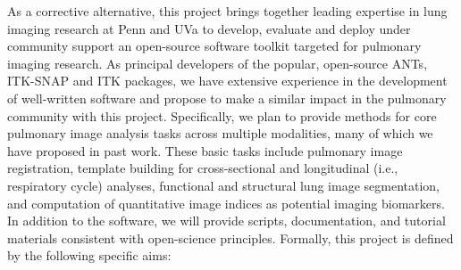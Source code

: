 \documentclass[11pt,]{article}
\begin{document}
As a corrective alternative, this project brings together leading
expertise in lung imaging research at Penn and UVa to develop, evaluate
and deploy under community support an open-source software toolkit
targeted for pulmonary imaging research. As principal developers of the
popular, open-source ANTs, ITK-SNAP and ITK packages, we have extensive
experience in the development of well-written software and propose to
make a similar impact in the pulmonary community with this project.
Specifically, we plan to provide methods for core pulmonary image
analysis tasks across multiple modalities, many of which we have
proposed in past work. These basic tasks include pulmonary image
registration, template building for cross-sectional and longitudinal
(i.e., respiratory cycle) analyses, functional and structural lung image
segmentation, and computation of quantitative image indices as potential
imaging biomarkers. In addition to the software, we will provide
scripts, documentation, and tutorial materials consistent with
open-science principles. Formally, this project is defined by the
following specific aims:
\end{document}
